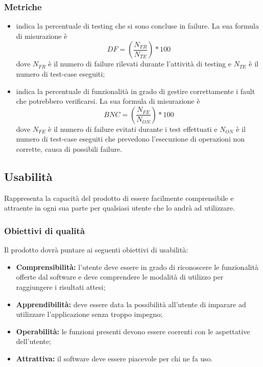 \documentclass[PianoDiQualifica.tex]{subfiles}
\begin{document}
\subsubsection{Metriche}
\begin{itemize}
	\item {} indica la percentuale di testing che si sono concluse in failure. La sua formula di misurazione è \[DF=(\frac{N_{FR}}{N_{TE}})*100\] dove $ N_{FR} $ è il numero di failure rilevati durante l'attività di testing e $ N_{TE} $ è il numero di test-case eseguiti;
	\item {} indica la percentuale di funzionalità in grado di gestire correttamente i fault che potrebbero verificarsi. La sua formula di misurazione è \[BNC=(\frac{N_{FE}}{N_{ON}})*100\] dove $ N_{FE} $ è il numero di failure evitati durante i test effettuati e $ N_{ON} $ è il numero di test-case eseguiti che prevedono l'esecuzione di operazioni non corrette, causa di possibili failure.
\end{itemize}
\subsection{Usabilità}
Rappresenta la capacità del prodotto di essere facilmente comprensibile e attraente in ogni sua parte per qualsiasi utente che lo andrà ad utilizzare.
\subsubsection{Obiettivi di qualità}
Il prodotto dovrà puntare ai seguenti obiettivi di usabilità:
\begin{itemize}
	\item \textbf{Comprensibilità:} l'utente deve essere in grado di riconoscere le funzionalità offerte dal software e deve comprendere le modalità di utilizzo per raggiungere i risultati attesi;
	\item \textbf{Apprendibilità:} deve essere data la possibilità all'utente di imparare ad utilizzare l'applicazione senza troppo impegno;
	\item \textbf{Operabilità:} le funzioni presenti devono essere coerenti con le aspettative dell'utente;
	\item \textbf{Attrattiva:} il software deve essere piacevole per chi ne fa uso.
\end{itemize}
\end{document}
